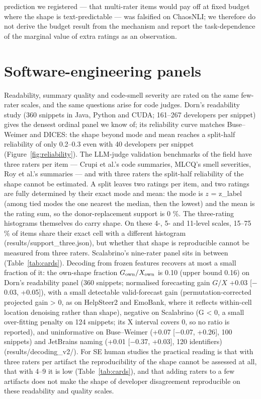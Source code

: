 \documentclass[10pt,twocolumn]{article}
\begin{document}
prediction we registered --- that multi-rater items would pay off at fixed budget where the shape is text-predictable --- was falsified on ChaosNLI; we therefore do not derive the budget result from the mechanism and report the task-dependence of the marginal value of extra ratings as an observation.

\section{Software-engineering panels}

Readability, summary quality and code-smell severity are rated on the same few-rater scales, and the same questions arise for code judges. Dorn's readability study (360 snippets in Java, Python and CUDA; 161--267 developers per snippet) gives the densest ordinal panel we know of; its reliability curve matches Buse--Weimer and DICES: the shape beyond mode and mean reaches a split-half reliability of only 0.2--0.3 even with 40 developers per snippet (Figure~\ref{fig:reliability}). The LLM-judge validation benchmarks of the field have three raters per item --- Crupi et al.'s code summaries, MLCQ's smell severities, Roy et al.'s summaries --- and with three raters the split-half reliability of the shape cannot be estimated. A split leaves two ratings per item, and two ratings are fully determined by their exact mode and mean: the mode is \(z\) = z\_label (among tied modes the one nearest the median, then the lowest) and the mean is the rating sum, so the donor-replacement support is 0 \%. The three-rating histograms themselves do carry shape. On these 4-, 5- and 11-level scales, 15--75 \% of items share their exact cell with a different histogram (results/support\_three.json), but whether that shape is reproducible cannot be measured from three raters. Scalabrino's nine-rater panel sits in between (Table~\ref{tab:cards}). Decoding from frozen features recovers at most a small fraction of it: the own-shape fraction \(G_{\rm own}/X_{\rm own}\) is 0.10 (upper bound 0.16) on Dorn's readability panel (360 snippets; normalised forecasting gain \(G/X\) +0.03 {[}$-$0.03, +0.05{]}), with a small detectable valid-forecast gain (permutation-corrected projected gain \textgreater{} 0, as on HelpSteer2 and EmoBank, where it reflects within-cell location denoising rather than shape), negative on Scalabrino (G \textless{} 0, a small over-fitting penalty on 124 snippets; its X interval covers 0, so no ratio is reported), and uninformative on Buse--Weimer (+0.07 {[}$-$0.07, +0.26{]}, 100 snippets) and JetBrains naming (+0.01 {[}$-$0.37, +0.03{]}, 120 identifiers) (results/decoding\_v2/). For SE human studies the practical reading is that with three raters per artifact the reproducibility of the shape cannot be assessed at all, that with 4--9 it is low (Table~\ref{tab:cards}), and that adding raters to a few artifacts does not make the shape of developer disagreement reproducible on these readability and quality scales.
\end{document}
